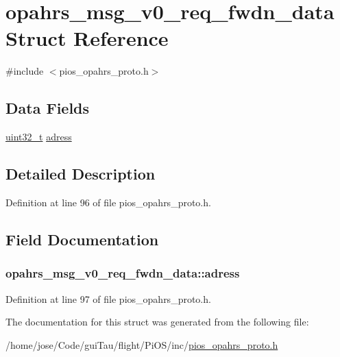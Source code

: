 \hypertarget{structopahrs__msg__v0__req__fwdn__data}{\section{opahrs\-\_\-msg\-\_\-v0\-\_\-req\-\_\-fwdn\-\_\-data Struct Reference}
\label{structopahrs__msg__v0__req__fwdn__data}
}


{\ttfamily \#include $<$pios\-\_\-opahrs\-\_\-proto.\-h$>$}

\subsection*{Data Fields}
\begin{DoxyCompactItemize}
\item 
\hyperlink{stdint_8h_a435d1572bf3f880d55459d9805097f62}{uint32\-\_\-t} \hyperlink{structopahrs__msg__v0__req__fwdn__data_a9bd9bf3b11c80d63a3ba64e534f3848d}{adress}
\end{DoxyCompactItemize}


\subsection{Detailed Description}


Definition at line 96 of file pios\-\_\-opahrs\-\_\-proto.\-h.



\subsection{Field Documentation}
\hypertarget{structopahrs__msg__v0__req__fwdn__data_a9bd9bf3b11c80d63a3ba64e534f3848d}{
\subsubsection[{adress}]{ opahrs\-\_\-msg\-\_\-v0\-\_\-req\-\_\-fwdn\-\_\-data\-::adress}}\label{structopahrs__msg__v0__req__fwdn__data_a9bd9bf3b11c80d63a3ba64e534f3848d}


Definition at line 97 of file pios\-\_\-opahrs\-\_\-proto.\-h.



The documentation for this struct was generated from the following file\-:\begin{DoxyCompactItemize}
\item 
/home/jose/\-Code/gui\-Tau/flight/\-Pi\-O\-S/inc/\hyperlink{pios__opahrs__proto_8h}{pios\-\_\-opahrs\-\_\-proto.\-h}\end{DoxyCompactItemize}
